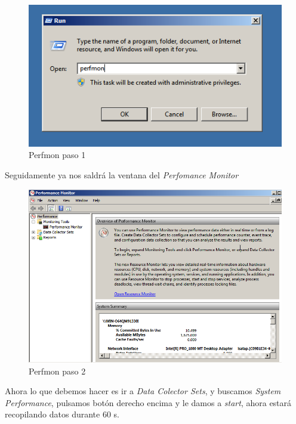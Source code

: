 \begin{figure}[H] %
	\centering
	\includegraphics[scale=0.5]{pics/perfmon1.png}  %
	\caption{Perfmon paso 1} \label{fig:perfmon1}
\end{figure}

Seguidamente ya nos saldrá la ventana del \textit{Perfomance Monitor}

\begin{figure}[H] %
	\centering
	\includegraphics[scale=0.5]{pics/perfmon2.png}  %
	\caption{Perfmon paso 2} \label{fig:perfmon2}
\end{figure}

Ahora lo que debemos hacer es ir a \textit{Data Colector Sets}, y buscamos \textit{System Performance}, pulsamos botón derecho encima y le damos a \textit{start}, ahora estará recopilando datos durante 60 s.

